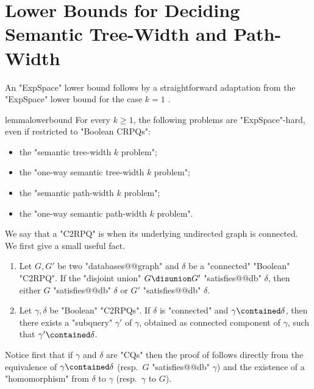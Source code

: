 

\section[Lower Bounds]{Lower Bounds for Deciding Semantic Tree-Width and Path-Width}
\label{sec:lowerbound}

An "ExpSpace" lower bound follows by a straightforward adaptation from the
"ExpSpace" lower bound for the case $k=1$ \cite[Proposition 6.2]{BarceloRomeroVardi2016SemanticAcyclicity}.
\begin{restatable}{lemma}{lowerbound}
    \AP\label{lemma:lowerbound}
    For every $k\geq 1$, the following problems are "ExpSpace"-hard, even if restricted to "Boolean CRPQs":
	\begin{itemize}
		\item the "semantic tree-width $k$ problem";
		\item the "one-way semantic tree-width $k$ problem";
		\item the "semantic path-width $k$ problem";
		\item the "one-way semantic path-width $k$ problem".
	\end{itemize}
\end{restatable}

\AP We say that a "C2RPQ" is  when its underlying undirected graph is connected.
We first give a small useful fact.

\begin{fact}
    \AP\label{fact:connectedness}\leavevmode
    \begin{enumerate}
        \item Let $G, G'$ be two "databases@@graph" and $\delta$ be a "connected" "Boolean" "C2RPQ".
            If the "disjoint union" $G \disunion G'$ "satisfies@@db" $\delta$, then either $G$ "satisfies@@db" $\delta$ or
            $G'$ "satisfies@@db" $\delta$.
        \item Let $\gamma,\delta$ be "Boolean" "C2RPQs". If $\delta$ is "connected"
            and $\gamma \contained \delta$, then there exists a "subquery" $\gamma'$ of $\gamma$,
            obtained as connected component of $\gamma$, such that
            $\gamma' \contained \delta$. 
    \end{enumerate}
\end{fact}

Notice first that if $\gamma$ and $\delta$ are "CQs" then the proof of
 follows directly from the equivalence of $\gamma \contained \delta$ (resp.\ $G$ "satisfies@@db" $\gamma$) and the existence of a "homomorphism" from $\delta$ to $\gamma$ (resp.\ $\gamma$ to $G$).

